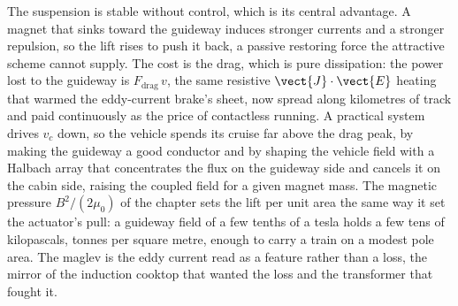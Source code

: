 The suspension is stable without control, which is its central advantage. A
magnet that sinks toward the guideway induces stronger currents and a stronger
repulsion, so the lift rises to push it back, a passive restoring force the
attractive scheme cannot supply. The cost is the drag, which is pure
dissipation: the power lost to the guideway is $F_{\text{drag}}\,v$, the same
resistive $\vect{J}\cdot\vect{E}$ heating that warmed the eddy-current brake's
sheet, now spread along kilometres of track and paid continuously as the price
of contactless running. A practical system drives $v_c$ down, so the vehicle
spends its cruise far above the drag peak, by making the guideway a good
conductor and by shaping the vehicle field with a Halbach array that
concentrates the flux on the guideway side and cancels it on the cabin side,
raising the coupled field for a given magnet mass. The magnetic pressure
$B^{2}/(2\mu_0)$ of the chapter sets the lift per unit area the same way it set
the actuator's pull: a guideway field of a few tenths of a tesla holds a few
tens of kilopascals, tonnes per square metre, enough to carry a train on a
modest pole area. The maglev is the eddy current read as a feature rather than
a loss, the mirror of the induction cooktop that wanted the loss and the
transformer that fought it.

